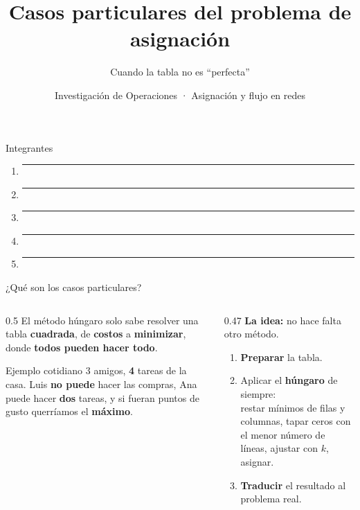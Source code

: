 \documentclass[aspectratio=169]{beamer}
\title{Casos particulares del problema de asignación}
\subtitle{Cuando la tabla no es ``perfecta''}
\author{Investigación de Operaciones · Asignación y flujo en redes}
\date{}
\begin{document}
\begin{frame}
  \titlepage
\end{frame}

\begin{frame}{Integrantes}
  \vspace{1em}
  \begin{enumerate}\setlength{\itemsep}{1.2em}
    \item \rule{0.7\textwidth}{0.4pt}
    \item \rule{0.7\textwidth}{0.4pt}
    \item \rule{0.7\textwidth}{0.4pt}
    \item \rule{0.7\textwidth}{0.4pt}
    \item \rule{0.7\textwidth}{0.4pt}
  \end{enumerate}
\end{frame}

\begin{frame}{¿Qué son los casos particulares?}
  \begin{columns}[T]
    \begin{column}{0.5\textwidth}
      El método húngaro solo sabe resolver una tabla \textbf{cuadrada}, de \textbf{costos} a \textbf{minimizar},
      donde \textbf{todos pueden hacer todo}.

      \medskip
      \begin{block}{Ejemplo cotidiano}
        3 amigos, \textbf{4} tareas de la casa. Luis \textbf{no puede} hacer las compras, Ana puede hacer
        \textbf{dos} tareas, y si fueran puntos de gusto querríamos el \textbf{máximo}.
      \end{block}
    \end{column}
    \begin{column}{0.47\textwidth}
      \textbf{La idea:} no hace falta otro método.
      \begin{enumerate}
        \item \textbf{Preparar} la tabla.
        \item Aplicar el \textbf{húngaro} de siempre:\\
              {\small restar mínimos de filas y columnas, tapar ceros con el menor número de líneas,
              ajustar con $k$, asignar.}
        \item \textbf{Traducir} el resultado al problema real.
      \end{enumerate}
    \end{column}
  \end{columns}
\end{frame}
\end{document}
